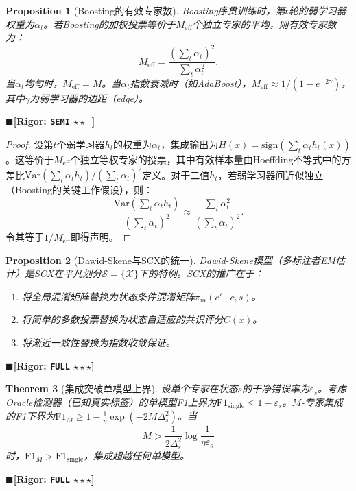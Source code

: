 \documentclass[12pt,a4paper]{ctexart}
\newtheorem{theorem}{Theorem}[section]
\newtheorem{proposition}[theorem]{Proposition}
\theoremstyle{definition}
\theoremstyle{remark}
\newcommand{\rigorFull}{$\blacksquare$\;\textbf{[Rigor: \texttt{FULL} $\star\star\star$]}}
\newcommand{\rigorSemi}{$\blacksquare$\;\textbf{[Rigor: \texttt{SEMI} $\star\star\;\;$]}}
\begin{document}
\begin{proposition}[Boosting的有效专家数]
\label{prop:2}
Boosting序贯训练时，第$t$轮的弱学习器权重为$\alpha_t$。若Boosting的加权投票等价于$M_{\text{eff}}$个独立专家的平均，则有效专家数为：
\begin{equation}
M_{\text{eff}} = \frac{(\sum_t \alpha_t)^2}{\sum_t \alpha_t^2}.
\end{equation}
当$\alpha_t$均匀时，$M_{\text{eff}} = M$。当$\alpha_t$指数衰减时（如AdaBoost），$M_{\text{eff}} \approx 1/(1-e^{-2\gamma})$，其中$\gamma$为弱学习器的边距（edge）。
\end{proposition}
\rigorSemi

\begin{proof}
设第$t$个弱学习器$h_t$的权重为$\alpha_t$，集成输出为$H(x) = \mathrm{sign}(\sum_t \alpha_t h_t(x))$。这等价于$M_{\text{eff}}$个独立等权专家的投票，其中有效样本量由Hoeffding不等式中的方差比$\mathrm{Var}(\sum_t \alpha_t h_t) / (\sum_t \alpha_t)^2$定义。对于二值$h_t$，若弱学习器间近似独立（Boosting的关键工作假设），则：
\begin{equation}
\frac{\mathrm{Var}(\sum_t \alpha_t h_t)}{(\sum_t \alpha_t)^2} \approx \frac{\sum_t \alpha_t^2}{(\sum_t \alpha_t)^2}.
\end{equation}
令其等于$1/M_{\text{eff}}$即得声明。
\end{proof}

\begin{proposition}[Dawid-Skene与SCX的统一]
\label{prop:3}
Dawid-Skene模型（多标注者EM估计）是SCX在平凡划分$\mathcal{S} = \{\mathcal{X}\}$下的特例。SCX的推广在于：
\begin{enumerate}[label=\arabic*.]
\item 将全局混淆矩阵替换为状态条件混淆矩阵$\pi_m(c' \mid c, s)$。
\item 将简单的多数投票替换为状态自适应的共识评分$C(x)$。
\item 将渐近一致性替换为指数收敛保证。
\end{enumerate}
\end{proposition}
\rigorFull

\begin{theorem}[集成突破单模型上界]
\label{thm:2.1}
设单个专家在状态$s$的干净错误率为$\varepsilon_s$。考虑Oracle检测器（已知真实标签）的单模型F1上界为$\mathrm{F1}_{\text{single}} \leq 1 - \varepsilon_s$。$M$-专家集成的F1下界为$\mathrm{F1}_M \geq 1 - \frac{1}{\eta}\exp(-2M\Delta_s^2)$。当
\begin{equation}
M > \frac{1}{2\Delta_s^2}\log\frac{1}{\eta\varepsilon_s}
\end{equation}
时，$\mathrm{F1}_M > \mathrm{F1}_{\text{single}}$，集成超越任何单模型。
\end{theorem}
\rigorFull
\end{document}
